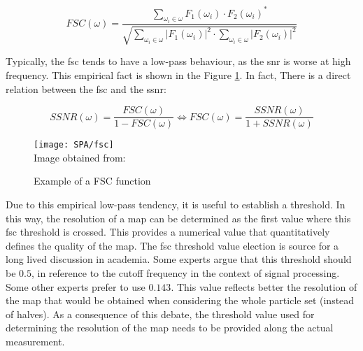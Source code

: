 \documentclass[../main.tex]{subfiles}
\begin{document}
\begin{equation}\label{eq:3:fsc}
    FSC(\omega) =   \frac{
                        \sum_{\omega_i \in \omega} F_1(\omega_i) \cdot F_2(\omega_i)^*
                    }{
                        \sqrt{\sum_{\omega_i \in \omega} |F_1(\omega_i)|^2 \cdot \sum_{\omega_i \in \omega} |F_2(\omega_i)|^2}
                    }
\end{equation}

Typically, the \gls{fsc} tends to have a low-pass behaviour, as the \gls{snr} is worse at high frequency. This empirical fact is shown in the Figure \ref{fig:3:fsc}.  In fact, There is a direct relation between the \gls{fsc} and the \gls{ssnr}:

\begin{equation}\label{eq:3:ssnr}
    SSNR(\omega) = \frac{FSC(\omega)}{1 - FSC(\omega)} \Leftrightarrow FSC(\omega) = \frac{SSNR(\omega)}{1 + SSNR(\omega)}
\end{equation}

\begin{figure}[htbp]
    \centering
    \texttt{[image: SPA/fsc]}\\
    Image obtained from: \cite{dubach2020}
    \caption{Example of a FSC function}
    \label{fig:3:fsc}
\end{figure}

Due to this empirical low-pass tendency, it is useful to establish a threshold. In this way, the resolution of a map can be determined as the first value where this \gls{fsc} threshold is crossed. This provides a numerical value that quantitatively defines the quality of the map. The \gls{fsc} threshold value election is source for a long lived discussion in academia. Some experts argue that this threshold should be $0.5$, in reference to the cutoff frequency in the context of signal processing. Some other experts prefer to use $0.143$. This value reflects better the resolution of the map that would be obtained when considering the whole particle set (instead of halves)\cite{chen2013}. As a consequence of this debate, the threshold value used for determining the resolution of the map needs to be provided along the actual measurement.
\end{document}
